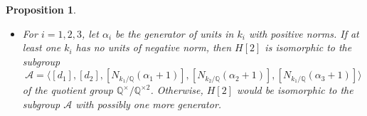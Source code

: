 \documentclass{jams-l}
\newtheorem{proposition}[theorem]{Proposition}
\theoremstyle{definition}
\theoremstyle{remark}
\numberwithin{equation}{section}
\begin{document}
\begin{proposition}
\begin{itemize}
\item[(iii)] For $i=1,2,3$, let $\alpha_i$ be the generator of units in $k_i$ with positive norms. If at least one $k_i$ has no units of negative norm, then $H[2]$ is isomorphic to the subgroup
\begin{equation} \label{equation, subgroup Q*}
\mathcal{A}	=\langle [d_1],[d_2],[N_{k_1/\mathbb{Q}}(\alpha_1+1)],[N_{k_2/\mathbb{Q}}(\alpha_2+1)], [N_{k_1/\mathbb{Q}}(\alpha_3+1)] \rangle
\end{equation}
of the quotient group $\mathbb{Q}^{\times}/\mathbb{Q}^{\times 2}$. Otherwise, $H[2]$ would be isomorphic to the subgroup $\mathcal{A}$ with possibly one more generator.
%

\end{itemize}
\end{proposition}
\end{document}
